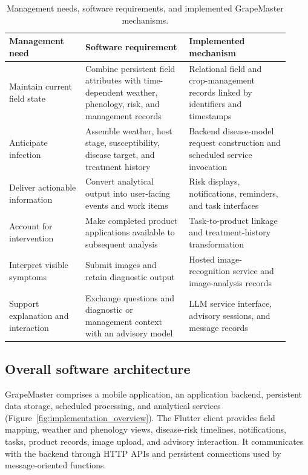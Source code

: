 \documentclass[12pt]{article}
\newcommand{\tablefontsize}{\fontsize{9pt}{11pt}\selectfont}
\begin{document}
\begin{table}[H]
\centering
\caption{Management needs, software requirements, and implemented GrapeMaster mechanisms.}
\label{tab:system_requirements}
\tablefontsize
\begin{tabular}{@{}p{0.25\linewidth} p{0.34\linewidth} p{0.33\linewidth}@{}}
\toprule
Management need & Software requirement & Implemented mechanism \\
\midrule
Maintain current field state & Combine persistent field attributes with time-dependent weather, phenology, risk, and management records & Relational field and crop-management records linked by identifiers and timestamps \\
Anticipate infection & Assemble weather, host stage, susceptibility, disease target, and treatment history & Backend disease-model request construction and scheduled service invocation \\
Deliver actionable information & Convert analytical output into user-facing events and work items & Risk displays, notifications, reminders, and task interfaces \\
Account for intervention & Make completed product applications available to subsequent analysis & Task-to-product linkage and treatment-history transformation \\
Interpret visible symptoms & Submit images and retain diagnostic output & Hosted image-recognition service and image-analysis records \\
Support explanation and interaction & Exchange questions and diagnostic or management context with an advisory model & LLM service interface, advisory sessions, and message records \\
\bottomrule
\end{tabular}
\end{table}

\subsection{Overall software architecture}\label{system-architecture}

GrapeMaster comprises a mobile application, an application backend, persistent data storage, scheduled processing, and analytical services (Figure~\ref{fig:implementation_overview}). The Flutter client provides field mapping, weather and phenology views, disease-risk timelines, notifications, tasks, product records, image upload, and advisory interaction. It communicates with the backend through HTTP APIs and persistent connections used by message-oriented functions.
\end{document}
